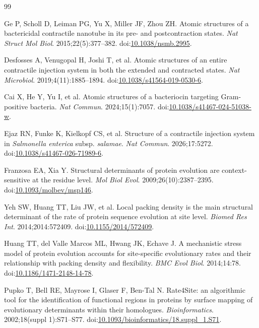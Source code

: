 \documentclass[11pt,a4paper]{article}
\begin{document}
\clearpage

\begin{thebibliography}{99}

Ge P, Scholl D, Leiman PG, Yu X, Miller JF, Zhou ZH. Atomic structures of a bactericidal contractile nanotube in its pre- and postcontraction states. \emph{Nat Struct Mol Biol}. 2015;22(5):377--382. doi:\href{https://doi.org/10.1038/nsmb.2995}{10.1038/nsmb.2995}.

Desfosses A, Venugopal H, Joshi T, et al. Atomic structures of an entire contractile injection system in both the extended and contracted states. \emph{Nat Microbiol}. 2019;4(11):1885--1894. doi:\href{https://doi.org/10.1038/s41564-019-0530-6}{10.1038/s41564-019-0530-6}.

Cai X, He Y, Yu I, et al. Atomic structures of a bacteriocin targeting Gram-positive bacteria. \emph{Nat Commun}. 2024;15(1):7057. doi:\href{https://doi.org/10.1038/s41467-024-51038-w}{10.1038/s41467-024-51038-w}.

Ejaz RN, Funke K, Kielkopf CS, et al. Structure of a contractile injection system in \emph{Salmonella enterica} subsp. \emph{salamae}. \emph{Nat Commun}. 2026;17:5272. doi:\href{https://doi.org/10.1038/s41467-026-71989-6}{10.1038/s41467-026-71989-6}.

Franzosa EA, Xia Y. Structural determinants of protein evolution are context-sensitive at the residue level. \emph{Mol Biol Evol}. 2009;26(10):2387--2395. doi:\href{https://doi.org/10.1093/molbev/msp146}{10.1093/molbev/msp146}.

Yeh SW, Huang TT, Liu JW, et al. Local packing density is the main structural determinant of the rate of protein sequence evolution at site level. \emph{Biomed Res Int}. 2014;2014:572409. doi:\href{https://doi.org/10.1155/2014/572409}{10.1155/2014/572409}.

Huang TT, del Valle Marcos ML, Hwang JK, Echave J. A mechanistic stress model of protein evolution accounts for site-specific evolutionary rates and their relationship with packing density and flexibility. \emph{BMC Evol Biol}. 2014;14:78. doi:\href{https://doi.org/10.1186/1471-2148-14-78}{10.1186/1471-2148-14-78}.

Pupko T, Bell RE, Mayrose I, Glaser F, Ben-Tal N. Rate4Site: an algorithmic tool for the identification of functional regions in proteins by surface mapping of evolutionary determinants within their homologues. \emph{Bioinformatics}. 2002;18(suppl 1):S71--S77. doi:\href{https://doi.org/10.1093/bioinformatics/18.suppl_1.S71}{10.1093/bioinformatics/18.suppl\_1.S71}.


\end{thebibliography}
\end{document}
